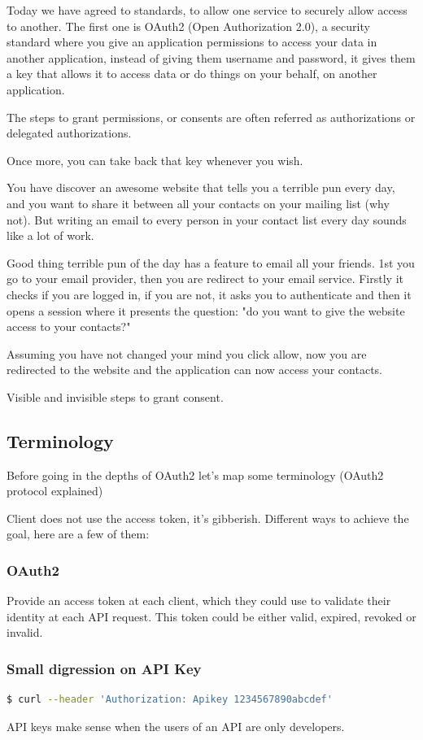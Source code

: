 \documentclass[11pt]{style}
\begin{document}
Today we have agreed to standards, to allow one service to securely allow access
to another.
The first one is OAuth2 (Open Authorization 2.0), a security standard where you give an application
permissions to access your data in another application, instead of giving them
username and password, it gives them a key that allows it to access data or do
things on your behalf, on another application.

The steps to grant permissions, or consents are often referred as authorizations
or delegated authorizations.

Once more, you can take back that key whenever you wish.

You have discover an awesome website that tells you a terrible pun every day,
and you want to share it between all your contacts on your mailing list (why
not).
But writing an email to every person in your contact list every day sounds like
a lot of work.

Good thing terrible pun of the day has a feature to email all your friends.
1st you go to your email provider, then you are redirect to your email service.
Firstly it checks if you are logged in, if you are not, it asks you to
authenticate and then it opens a session where it presents the question: "do you
want to give the website access to your contacts?"

Assuming you have not changed your mind you click allow, now you are redirected
to the website and the application can now access your contacts.

Visible and invisible steps to grant consent.
\subsection{Terminology}
Before going in the depths of OAuth2 let's map some terminology
(OAuth2 protocol explained)

Client does not use the access token, it's gibberish.
Different ways to achieve the goal, here are a few of them:


\subsubsection{OAuth2}
Provide an access token at each client, which they could use to validate their
identity at each API request.  This token could be either valid, expired,
revoked or invalid.

\subsubsection{Small digression on API Key}
\begin{lstlisting}[language=bash]
$ curl --header 'Authorization: Apikey 1234567890abcdef'
\end{lstlisting}
API keys make sense when the users of an API are only developers.
\end{document}
